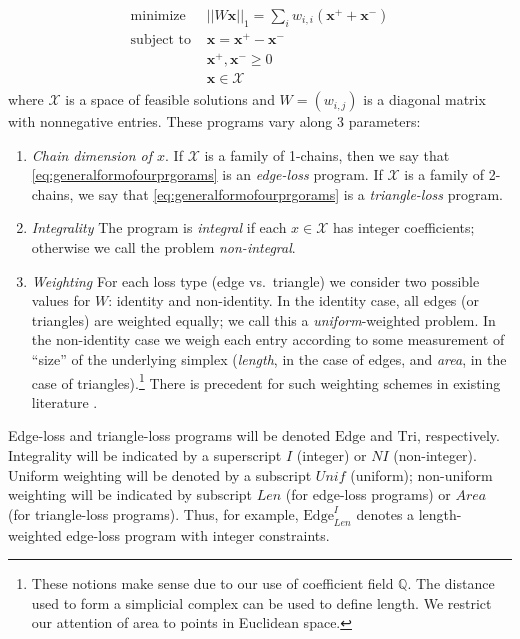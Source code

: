 \documentclass[11pt,onecolumn]{article}
\newcommand{\Q}{\mathbb{Q}}
\newcommand{\optimalrep}{\mathbf{x}}
\newcommand{\feasibleset}{\mathcal{X}}
\newcommand{\Edge}{\mathrm{Edge}}
\newcommand{\Tri}{\mathrm{Tri}}
\theoremstyle{plain}
\theoremstyle{definition}
\begin{document}
\begin{align}
\begin{split}
    \text{minimize } & || W \optimalrep||_1 = \sum_i w_{i,i} (\optimalrep^+ + \optimalrep^-) \\
    \text{subject to } 
    & \optimalrep = \optimalrep^+ - \optimalrep^- \\
    & \optimalrep^+, \optimalrep^- \ge 0 \\
    & \optimalrep \in \feasibleset
\end{split}
\label{eq:generalformofourprgorams}
\end{align}
where $\feasibleset$ is a space of feasible solutions and $W = (w_{i,j})$ is a diagonal matrix with nonnegative entries.  These programs vary along 3 parameters:
    \begin{enumerate}
        \item \emph{Chain dimension of $x$}.  If $\feasibleset$ is a family of 1-chains, then we say that \eqref{eq:generalformofourprgorams} is an \emph{edge-loss} program.  If $\feasibleset$ is a family of 2-chains, we say that \eqref{eq:generalformofourprgorams} is a \emph{triangle-loss} program.
        
        \item \emph{Integrality}  The program is \emph{integral} if each $x \in \feasibleset$ has integer coefficients; otherwise we call the problem \emph{non-integral}.
        
        \item \emph{Weighting}  For each loss type (edge vs.\ triangle) we consider two possible values for $W$: identity and non-identity.  In the identity case, all edges (or triangles) are weighted equally; we call this a \emph{uniform}-weighted problem.  In the non-identity case we weigh each entry according to some measurement of ``size'' of the underlying simplex (\emph{length}, in the case of edges, and \emph{area}, in the case of triangles).\footnote{These notions make sense due to our use of coefficient field $\Q$. The distance used to form a simplicial complex can be used to define length. We restrict our attention of area to points in Euclidean space.}  There is precedent for such weighting schemes in existing literature \cite{dey2011optimal, chenquantifying}.
    \end{enumerate}

Edge-loss and triangle-loss programs will be denoted $\Edge$ and $\Tri$, respectively.  Integrality will be indicated by a superscript $I$ (integer) or $NI$ (non-integer).  Uniform weighting will be denoted by a subscript $Unif$ (uniform); non-uniform weighting will be indicated by subscript $Len$ (for edge-loss programs) or $Area$ (for triangle-loss programs).  Thus, for example, $\Edge^{I}_{Len}$ denotes a length-weighted edge-loss program with integer constraints.
\end{document}
